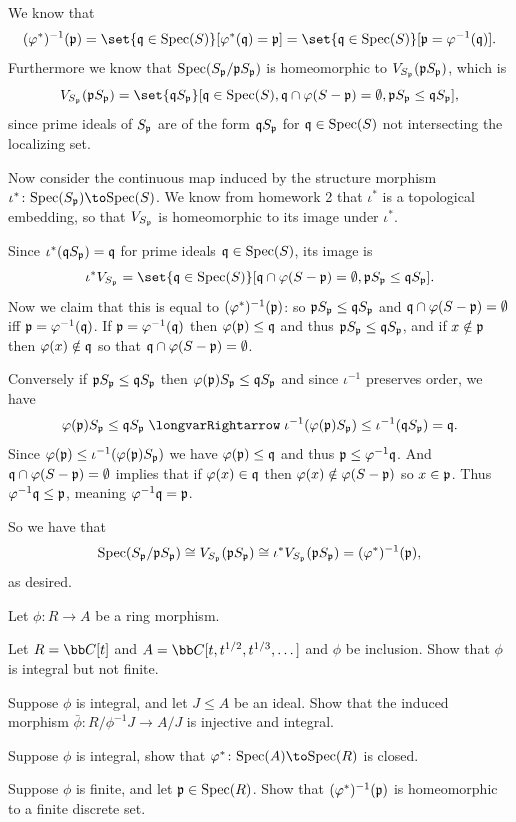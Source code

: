     \item We know that
    $$ (\phi^*)^{-1}(\p) = \set{\q\in\spec(S)}[\phi^*(\q)=\p] = \set{\q\in\spec(S)}[\p=\phi^{-1}(\q)] . $$
    Furthermore we know that ${\rm Spec}(S_{{\frak p}}/{{\frak p}} S_{{\frak p}})$ is homeomorphic to $V_{S_{{\frak p}}}({{\frak p}} S_{{\frak p}})$, which is
    $$ V_{S_\p}(\p S_\p) = \set{\q S_\p}[\q\in\spec(S),\q\cap\phi(S-\p)=\emptyset,\p S_\p\leq\q S_\p] , $$
    since prime ideals of $S_{{\frak p}}$ are of the form ${{\frak q}} S_{{\frak p}}$ for ${{\frak q}}\in{\rm Spec}(S)$ not intersecting the localizing set.

    Now consider the continuous map induced by the structure morphism $\iota^*\colon\spec(S_\p)\to\spec(S)$.
    We know from homework 2 that $\iota^*$ is a topological embedding, so that $V_{S_{{\frak p}}}$ is homeomorphic
    to its image under $\iota^*$.

    Since $\iota^*({{\frak q}} S_{{\frak p}})={{\frak q}}$ for prime ideals ${{\frak q}}\in{\rm Spec}(S)$, its image is
    $$ \iota^* V_{S_\p} = \set{\q\in\spec(S)}[\q\cap\phi(S-\p)=\emptyset,\p S_\p\leq\q S_\p] . $$
    Now we claim that this is equal to $(\varphi^*)^{-1}({{\frak p}})$: so ${{\frak p}} S_{{\frak p}}\leq{{\frak q}} S_{{\frak p}}$ and ${{\frak q}}\cap\varphi(S-{{\frak p}})=\emptyset$ iff
    ${{\frak p}}=\varphi^{-1}({{\frak q}})$.
    If ${{\frak p}}=\varphi^{-1}({{\frak q}})$ then $\varphi({{\frak p}})\leq{{\frak q}}$ and thus ${{\frak p}} S_{{\frak p}}\leq{{\frak q}} S_{{\frak p}}$, and if $x\notin{{\frak p}}$ then $\varphi(x)\notin{{\frak q}}$
    so that ${{\frak q}}\cap\varphi(S-{{\frak p}})=\emptyset$.

    Conversely if ${{\frak p}} S_{{\frak p}}\leq{{\frak q}} S_{{\frak p}}$ then $\varphi({{\frak p}})S_{{\frak p}}\leq{{\frak q}} S_{{\frak p}}$ and since $\iota^{-1}$ preserves order, we have
    $$ \phi(\p)S_\p \leq \q S_\p \implies \iota^{-1}(\phi(\p)S_\p) \leq \iota^{-1}(\q S_\p) = \q . $$
    Since $\varphi({{\frak p}})\leq\iota^{-1}(\varphi({{\frak p}})S_{{\frak p}})$ we have $\varphi({{\frak p}})\leq{{\frak q}}$ and thus ${{\frak p}}\leq\varphi^{-1}{{\frak q}}$.
    And ${{\frak q}}\cap\varphi(S-{{\frak p}})=\emptyset$ implies that if $\varphi(x)\in{{\frak q}}$ then $\varphi(x)\notin\varphi(S-{{\frak p}})$ so $x\in{{\frak p}}$.
    Thus $\varphi^{-1}{{\frak q}}\leq{{\frak p}}$, meaning $\varphi^{-1}{{\frak q}}={{\frak p}}$.

    So we have that
    $$ {\rm Spec}(S_{{\frak p}}/{{\frak p}} S_{{\frak p}}) \cong V_{S_{{\frak p}}}({{\frak p}} S_{{\frak p}}) \cong \iota^* V_{S_{{\frak p}}}({{\frak p}} S_{{\frak p}}) = (\varphi^*)^{-1}({{\frak p}}) , $$
    as desired.
\eenum

\bprob

    Let $\phi\colon R\to A$ be a ring morphism.
    \benum
        \item Let $R=\bC[t]$ and $A=\bC[t,t^{1/2},t^{1/3},\dots]$ and $\phi$ be inclusion.
        Show that $\phi$ is integral but not finite.
        \item Suppose $\phi$ is integral, and let $J\leq A$ be an ideal.
        Show that the induced morphism $\bar\phi\colon R/\phi^{-1}J\to A/J$ is injective and integral.
        \item Suppose $\phi$ is integral, show that $\phi^*\colon\spec(A)\to\spec(R)$ is closed.
        \item Suppose $\phi$ is finite, and let ${{\frak p}}\in{\rm Spec}(R)$.
        Show that $(\varphi^*)^{-1}({{\frak p}})$ is homeomorphic to a finite discrete set.
    \eenum

